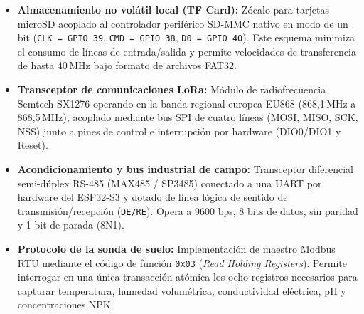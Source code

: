 \begin{itemize}
    \item \textbf{Almacenamiento no volátil local (TF Card):} Zócalo para tarjetas microSD acoplado al controlador periférico SD-MMC nativo en modo de un bit (\texttt{CLK = GPIO 39}, \texttt{CMD = GPIO 38}, \texttt{D0 = GPIO 40}). Este esquema minimiza el consumo de líneas de entrada/salida y permite velocidades de transferencia de hasta 40\,MHz bajo formato de archivos FAT32.
    
    \item \textbf{Transceptor de comunicaciones LoRa:} Módulo de radiofrecuencia Semtech SX1276 operando en la banda regional europea EU868 (868,1\,MHz a 868,5\,MHz), acoplado mediante bus SPI de cuatro líneas (MOSI, MISO, SCK, NSS) junto a pines de control e interrupción por hardware (DIO0/DIO1 y Reset).
    
    \item \textbf{Acondicionamiento y bus industrial de campo:} Transceptor diferencial semi-dúplex RS-485 (MAX485 / SP3485) conectado a una UART por hardware del ESP32-S3 y dotado de línea lógica de sentido de transmisión/recepción (\texttt{DE/RE}). Opera a 9600 bps, 8 bits de datos, sin paridad y 1 bit de parada (8N1).
    
    \item \textbf{Protocolo de la sonda de suelo:} Implementación de maestro Modbus RTU mediante el código de función \texttt{0x03} (\textit{Read Holding Registers}). Permite interrogar en una única transacción atómica los ocho registros necesarios para capturar temperatura, humedad volumétrica, conductividad eléctrica, pH y concentraciones NPK.
\end{itemize}

